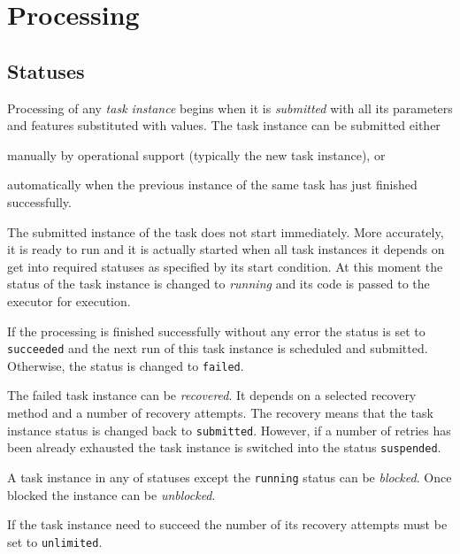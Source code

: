 \documentclass[a4paper,12pt,english,oneside]{book}
\begin{document}
\section{Processing}

\subsection{Statuses}

Processing of any \emph{task instance} begins when it is \emph{submitted} with all its parameters and features substituted with values. The task instance can be submitted either%
\begin{inparaenum}[(i)]
\item manually by operational support (typically the new task instance), or
\item automatically when the previous instance of the same task has just finished successfully.
\end{inparaenum}

The submitted instance of the task does not start immediately. More accurately, it is ready to run and it is actually started when all task instances it depends on get into required statuses as specified by its start condition. At this moment the status of the task instance is changed to \emph{running} and its code is passed to the executor for execution.

If the processing is finished successfully without any error the status is set to \verb|succeeded| and the next run of this task instance is scheduled and submitted. Otherwise, the status is changed to \verb|failed|.

The failed task instance can be \emph{recovered}. It depends on a selected recovery method and a number of recovery attempts. The recovery means that the task instance status is changed back to \verb|submitted|. However, if a number of retries has been already exhausted the task instance is switched into the status \verb|suspended|.

A task instance in any of statuses except the \verb|running| status can be \emph{blocked}. Once blocked the instance can be \emph{unblocked}.

If the task instance need to succeed the number of its recovery attempts must be set to \verb|unlimited|.
\end{document}
